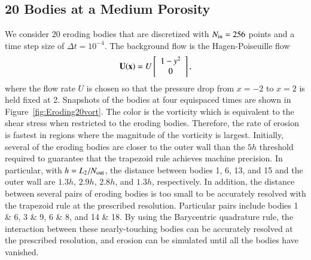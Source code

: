 \documentclass[preprint, 10pt]{elsarticle}
\begin{document}
\subsection{20 Bodies at a Medium Porosity}
We consider 20 eroding bodies that are discretized with $N_{\mathrm{in}}=256$
points and a time step size of $\Delta t = 10^{-4}$.  The background
flow is the Hagen-Poiseuille flow
\begin{align}
  {\mathbf{U}}({\mathbf{x}})=U \left[
  \begin{array}{c}
    1-y^2 \\ 0
  \end{array}
  \right],
\end{align}
where the flow rate $U$ is chosen so that the pressure drop from $x=-2$
to $x=2$ is held fixed at 2.  Snapshots of the bodies at four equispaced
times are shown in Figure~\ref{fig:Eroding20vort}.  The color is the
vorticity which is equivalent to the shear stress when restricted to the
eroding bodies.  Therefore, the rate of erosion is fastest in regions
where the magnitude of the vorticity is largest.  Initially, several of
the eroding bodies are closer to the outer wall than the $5h$ threshold
required to guarantee that the trapezoid rule achieves machine
precision.  In particular, with $h=L_2/N_{\mathrm{out}}$, the distance between
bodies 1, 6, 13, and 15 and the outer wall are $1.3h$, $2.9h$, $2.8h$,
and $1.3h$, respectively.  In addition, the distance between several
pairs of eroding bodies is too small to be accurately resolved with the
trapezoid rule at the prescribed resolution.  Particular pairs include
bodies 1 \& 6, 3 \& 9, 6 \& 8, and 14 \& 18.  By using the Barycentric
quadrature rule, the interaction between these nearly-touching bodies
can be accurately resolved at the prescribed resolution, and erosion can
be simulated until all the bodies have vanished.
\end{document}
